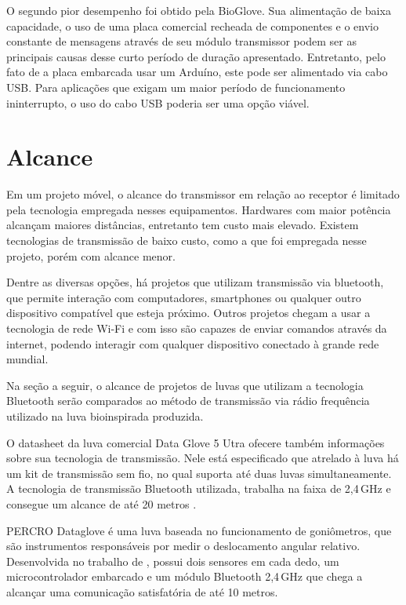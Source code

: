 \documentclass[
	12pt,				%
	openright,			%
	oneside,			%
	a4paper,			%
	english,			%
	brazil				%
	]{abntex2}
\begin{document}
		O segundo pior desempenho foi obtido pela BioGlove. Sua alimentação de baixa capacidade, o uso de uma placa comercial recheada de componentes e o envio constante de mensagens através de seu módulo transmissor podem ser as principais causas desse curto período de duração apresentado. Entretanto, pelo fato de a placa embarcada usar um Arduíno, este pode ser alimentado via cabo USB. Para aplicações que exigam um maior período de funcionamento ininterrupto, o uso do cabo USB poderia ser uma opção viável.

			\section{Alcance}

			Em um projeto móvel, o alcance do transmissor em relação ao receptor é limitado pela tecnologia empregada nesses equipamentos. Hardwares com maior potência alcançam maiores distâncias, entretanto tem custo mais elevado. Existem tecnologias de transmissão de baixo custo, como a que foi empregada nesse projeto, porém com alcance menor. 
			
			Dentre as diversas opções, há projetos que utilizam transmissão via bluetooth, que permite interação com computadores, smartphones ou qualquer outro dispositivo compatível que esteja próximo. Outros projetos chegam a usar a tecnologia de rede Wi-Fi e com isso são capazes de enviar comandos através da internet, podendo interagir com qualquer dispositivo conectado à grande rede mundial. 

			Na seção a seguir, o alcance de projetos de luvas que utilizam a tecnologia Bluetooth serão comparados ao método de transmissão via rádio frequência utilizado na luva bioinspirada produzida.

			O datasheet da luva comercial Data Glove 5 Utra ofecere também informações sobre sua tecnologia de transmissão. Nele está especificado que atrelado à luva há um kit de transmissão sem fio, no qual suporta até duas luvas simultaneamente. A tecnologia de transmissão Bluetooth utilizada, trabalha na faixa de 2,4$\,$GHz e consegue um alcance de até 20 metros \cite{5DT-ultra}.

			PERCRO Dataglove é uma luva baseada no funcionamento de goniômetros, que são instrumentos responsáveis por medir o deslocamento angular relativo. Desenvolvida no trabalho de \cite{rodriguez2007goniometric}, possui dois sensores em cada dedo, um microcontrolador embarcado e um módulo Bluetooth 2,4$\,$GHz que chega a alcançar uma comunicação satisfatória de até 10 metros.
\end{document}
